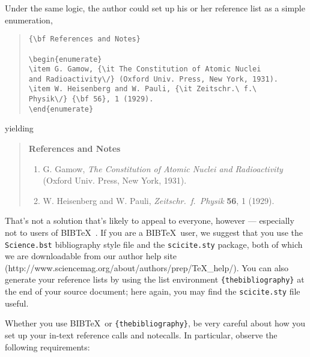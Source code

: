 \documentclass[12pt]{article}
\begin{document}
Under the same logic, the author could set up his or her reference list as a simple enumeration,

\begin{quote}
\begin{verbatim}
{\bf References and Notes}

\begin{enumerate}
\item G. Gamow, {\it The Constitution of Atomic Nuclei
and Radioactivity\/} (Oxford Univ. Press, New York, 1931).
\item W. Heisenberg and W. Pauli, {\it Zeitschr.\ f.\ 
Physik\/} {\bf 56}, 1 (1929).
\end{enumerate}
\end{verbatim}
\end{quote}

\noindent yielding

\begin{quote}
{\bf References and Notes}

\begin{enumerate}
\item G. Gamow, {\it The Constitution of Atomic Nuclei and
Radioactivity\/} (Oxford Univ. Press, New York, 1931).
\item W. Heisenberg and W. Pauli, {\it Zeitschr.\ f.\ Physik} {\bf 56},
1 (1929).
\end{enumerate}
\end{quote}

That's not a solution that's likely to appeal to everyone, however ---
especially not to users of B{\small{IB}}\TeX\ \cite{inclme}.  If you
are a B{\small{IB}}\TeX\ user, we suggest that you use the
\texttt{Science.bst} bibliography style file and the
\texttt{scicite.sty} package, both of which we are downloadable from our author help site
(http://www.sciencemag.org/about/authors/prep/TeX\_help/).  You can also
generate your reference lists by using the list environment
\texttt{\{thebibliography\}} at the end of your source document; here
again, you may find the \texttt{scicite.sty} file useful.

Whether you use B{\small{IB}}\TeX\ or \texttt{\{thebibliography\}}, be
very careful about how you set up your in-text reference calls and
notecalls.  In particular, observe the following requirements:
\end{document}
